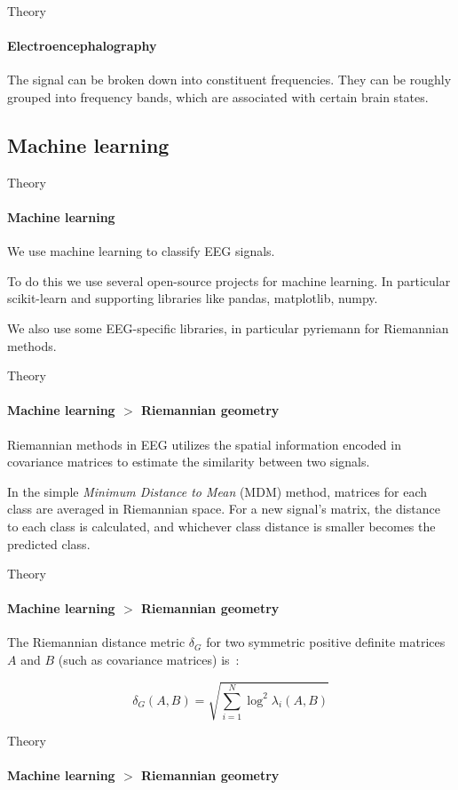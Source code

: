 \documentclass[xcolor={dvipsnames,table},12pt]{beamer}
\begin{document}
\begin{frame}{Theory}
    \framesubtitle{Electroencephalography}
    The signal can be broken down into constituent frequencies. They can be roughly grouped into frequency bands, which are associated with certain brain states.

    {
        \small
        
    }
\end{frame}

\subsection{Machine learning}
\begin{frame}{Theory}
    \framesubtitle{Machine learning}

    We use machine learning to classify EEG signals.

    To do this we use several open-source projects for machine learning. In particular scikit-learn and supporting libraries like pandas, matplotlib, numpy.

    We also use some EEG-specific libraries, in particular pyriemann for Riemannian methods.
\end{frame}

\begin{frame}{Theory}
    \framesubtitle{Machine learning $>$ Riemannian geometry}
    
    Riemannian methods in EEG utilizes the spatial information encoded in covariance matrices to estimate the similarity between two signals.

    In the simple \emph{Minimum Distance to Mean} (MDM) method, matrices for each class are averaged in Riemannian space. For a new signal's matrix, the distance to each class is calculated, and whichever class distance is smaller becomes the predicted class.
\end{frame}

\begin{frame}{Theory}
    \framesubtitle{Machine learning $>$ Riemannian geometry}
    
    \small The Riemannian distance metric $\delta_G$ for two symmetric positive definite matrices $A$ and $B$ (such as covariance matrices) is~\cite{grafarend_metric_2003}:

        \[ \delta_G(A, B) = \sqrt{\sum_{i=1}^N \log^2 \lambda_i (A, B) } \]
\end{frame}

\begin{frame}{Theory}
    \framesubtitle{Machine learning $>$ Riemannian geometry}
    {
        \scriptsize
        
    }
\end{frame}
\end{document}
